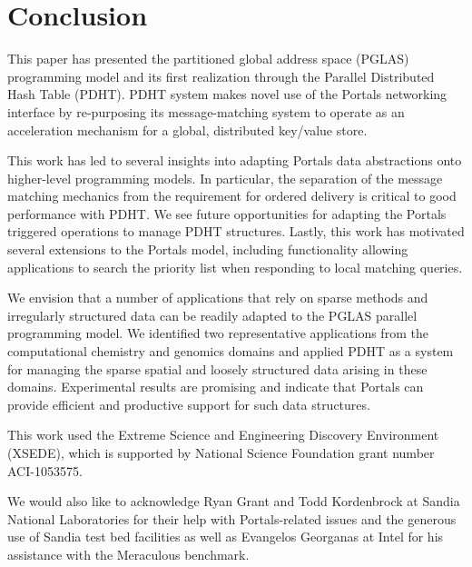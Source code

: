 \section{Conclusion}

This paper has presented the partitioned global address space (PGLAS)
programming model and its first realization through the Parallel Distributed
Hash Table (PDHT).  PDHT system makes novel use of the Portals networking
interface by re-purposing its message-matching system to operate as an
acceleration mechanism for a global, distributed key/value store.

This work has led to several insights into adapting Portals data abstractions
onto higher-level programming models. In particular, the separation of the
message matching mechanics from the requirement for ordered delivery is
critical to good performance with PDHT. We see future opportunities for
adapting the Portals triggered operations to manage PDHT structures. Lastly,
this work has motivated several extensions to the Portals model, including
functionality allowing applications to search the priority list when responding
to local matching queries.

We envision that a number of applications that rely on sparse methods and
irregularly structured data can be readily adapted to the PGLAS parallel
programming model.  We identified two representative applications from the
computational chemistry and genomics domains and applied PDHT as a system for
managing the sparse spatial and loosely structured data arising in these
domains.  Experimental results are promising and indicate that Portals can
provide efficient and productive support for such data structures.

\begin{acks}
This work used the Extreme Science and Engineering Discovery Environment
(XSEDE), which is supported by National Science Foundation grant number
ACI-1053575.

We would also like to acknowledge Ryan Grant and Todd Kordenbrock at Sandia
National Laboratories for their help with Portals-related issues and the
generous use of Sandia test bed facilities as well as Evangelos Georganas at
Intel for his assistance with the Meraculous benchmark.
\end{acks}
